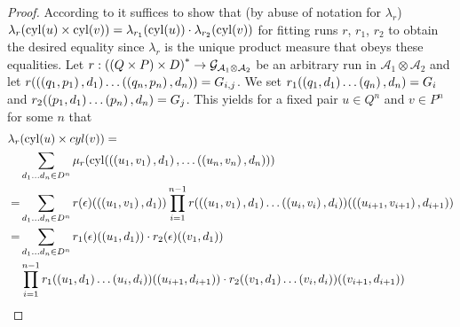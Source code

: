 \begin{proof}
  According to \cite[Theorem 23.2]{Bauer} it suffices to show that (by abuse of
  notation for $\lambda_{r}$)
  $\lambda_{r}(\operatorname{cyl}(u)\times\operatorname{cyl}(v)) = \lambda_{r_{1}}(\operatorname{cyl}(u))
    \cdot\lambda_{r_{2}}(\operatorname{cyl}(v))$ for fitting runs $r$, $r_{1}$, $r_{2}$ to
  obtain the desired equality since $\lambda_{r}$ is the unique product measure
  that obeys these equalities. Let
  $r:\left(\left(Q\times P\right)\times D\right)^{*}\rightarrow \mathcal{G}_{
    \mathcal{A}_{1}\otimes\mathcal{A}_{2}}$ be an arbitrary run in
  $\mathcal{A}_{1}\otimes\mathcal{A}_{2}$ and let
  $r(\left(\left(q_{1}, p_{1}\right), d_{1}\right)\dots\left(\left(q_{n}, p_{n}\right),
    d_{n}\right)) = G_{i,j}$. We set $r_{1}(\left(q_{1}, d_{1}\right)\dots\left(q_{n}\right),
    d_{n}) = G_{i}$ and $r_{2}(\left(p_{1}, d_{1}\right)\dots\left(p_{n}\right), d_{n})
    = G_{j}$. This yields for a fixed pair $u\in Q^{n}$ and $v\in P^{n}$ for
    some $n$ that
  \begin{align}
    \lambda_{r}&(\operatorname{cyl}(u)\times cyl(v)) =\\
    &\sum\limits_{d_{1}\dots d_{n}\in D^{n}}
    \mu_{r}(\operatorname{cyl}(\left(\left(u_{1}, v_{1}\right), d_{1}\right),\dots\left(
      \left(u_{n}, v_{n}\right), d_{n}\right)))\\
    =&\sum\limits_{d_{1}\dots d_{n}\in D^{n}}r(\epsilon)(\left(\left(u_{1},
    v_{1}\right),d_{1}\right))\prod\limits_{i=1}^{n-1}r(\left(\left(u_{1}, v_{1}\right), d_{1}\right)
    \dots\left(\left(u_{i}, v_{i}\right), d_{i}\right))(\left(\left(u_{i+1}, v_{i+1}\right), d_{i+1}\right))\\
    =&\sum\limits_{d_{1}\dots d_{n}\in D^{n}}r_{1}(\epsilon)(\left(u_{1}, d_{1}\right))
    \cdot r_{2}(\epsilon)(\left(v_{1}, d_{1}\right))\\
    &\prod\limits_{i=1}^{n-1}
    r_{1}(\left(u_{1}, d_{1}\right)\dots\left(u_{i}, d_{i}\right))(\left(u_{i+1}, d_{i+1}\right))
    \cdot r_{2}(\left(v_{1}, d_{1}\right)\dots\left(v_{i}, d_{i}\right))(\left(v_{i+1}, d_{i+1}\right))
  \end{align}
\end{proof} 

